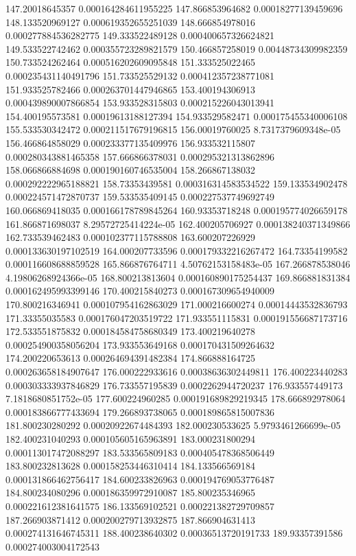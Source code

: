 {147.20018645357 0.000164284611955225
147.866853964682 0.00018277139459696
148.133520969127 0.000619352655251039
148.666854978016 0.000277884536282775
149.333522489128 0.000400657326624821
149.533522742462 0.000355723289821579
150.466857258019 0.00448734309982359
150.733524262464 0.000516202609095848
151.333525022465 0.000235431140491796
151.733525529132 0.000412357238771081
151.933525782466 0.000263701447946865
153.400194306913 0.000439890007866854
153.933528315803 0.000215226043013941
154.400195573581 0.00019613188127394
154.933529582471 0.000175455340006108
155.533530342472 0.000211517679196815
156.00019760025 8.7317379609348e-05
156.466864858029 0.000233377135409976
156.933532115807 0.000280343881465358
157.666866378031 0.000295321313862896
158.066866884698 0.000190160746535004
158.266867138032 0.000292222965188821
158.73353439581 0.000316314583534522
159.133534902478 0.000224571472870737
159.533535409145 0.000227537749692749
160.066869418035 0.000166178789845264
160.93353718248 0.000195774026659178
161.866871698037 8.29572725414224e-05
162.400205706927 0.000138240371349866
162.733539462483 0.000102377115788808
163.600207226929 0.000133630197102519
164.000207733596 0.000179332216267472
164.73354199582 0.000116608688859528
165.866876764711 4.50762153158483e-05
167.266878538046 4.19806268924366e-05
168.800213813604 0.000160890175254437
169.866881831384 0.000162495993399146
170.400215840273 0.000167309654940009
170.800216346941 0.000107954162863029
171.000216600274 0.00014443532836793
171.33355035583 0.000176047203519722
171.933551115831 0.000191556687173716
172.533551875832 0.000184584758680349
173.400219640278 0.000254900358056204
173.933553649168 0.000170431509264632
174.200220653613 0.000264694391482384
174.866888164725 0.000263658184907647
176.000222933616 0.00038636302449811
176.400223440283 0.000303333937846829
176.733557195839 0.0002262944720237
176.933557449173 7.1818680851752e-05
177.600224960285 0.000191689829219345
178.666892978064 0.000183866777433694
179.266893738065 0.000189865815007836
181.800230280292 0.00020922674484393
182.000230533625 5.9793461266699e-05
182.400231040293 0.000105605165963891
183.000231800294 0.000113017472088297
183.533565809183 0.000405478368506449
183.800232813628 0.000158253446310414
184.133566569184 0.000131866462756417
184.600233826963 0.000194769053776487
184.800234080296 0.000186359972910087
185.800235346965 0.000221612381641575
186.133569102521 0.000221382729709857
187.266903871412 0.000200279713932875
187.866904631413 0.000274131646745311
188.400238640302 0.00036513720191733
189.93357391586 0.000274003004172543
}
